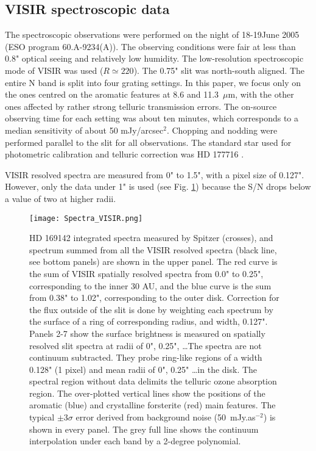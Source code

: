 \documentclass{aa}
\newcommand{\mic}{~$\mu$m\xspace}
\begin{document}
\subsection{VISIR spectroscopic data} \label{sec:spectra}
The spectroscopic observations were performed on the night of 18-19June 2005 (ESO program 60.A-9234(A)). The observing conditions were fair at less than 0.8" optical seeing and relatively low humidity.
The low-resolution spectroscopic mode of VISIR was used ($R\simeq220$). The 0.75" slit was  north-south aligned. The entire N band is split into four grating settings. In this paper, we focus only on the ones centred on the aromatic features at 8.6 and 11.3\mic, with the other ones  affected by rather strong telluric transmission errors. The on-source observing time for each setting was about ten minutes, which corresponds to a median sensitivity of about 50 mJy/arcsec$^2$. 
Chopping and nodding were performed parallel to the slit for all observations. The standard star used for photometric calibration and telluric correction was HD 177716 \citep{Cohen1999}.

VISIR resolved spectra are measured from 0" to 1.5", with a pixel size of 0.127". However, only the data under 1" is used (see Fig. \ref{fig:VISspectra}) because the S/N drops below a value of two at higher radii.
 
\begin{figure}[!ht]
    \raggedleft
    \texttt{[image: Spectra\_VISIR.png]}
    \centering
    \caption{HD 169142 integrated spectra measured by Spitzer (crosses), and spectrum summed from all the VISIR resolved spectra (black line, see bottom panels) are shown in the upper panel. The red curve is the sum of VISIR spatially resolved spectra from 0.0" to 0.25", corresponding to the inner 30 AU, and the blue curve is the sum from 0.38" to 1.02", corresponding to the outer disk. Correction for the flux outside of the slit is done by weighting each spectrum by the surface of a ring of corresponding radius, and width, 0.127". Panels 2-7 show the surface brightness is measured on spatially resolved slit spectra at radii of 0", 0.25", \dots The spectra are not continuum subtracted. They probe ring-like regions of a width 0.128" (1 pixel) and mean radii of 0", 0.25" \dots in the disk. The spectral region without data delimits the telluric ozone absorption region. The over-plotted vertical lines show the positions of the aromatic (blue) and crystalline forsterite (red) main features. The typical $\pm$3$\sigma$ error derived from background noise (50~mJy.as$^{-2}$) is shown in every panel. The grey full line shows the continuum interpolation under each band by a 2-degree polynomial.}
    \label{fig:VISspectra}
\end{figure}
\end{document}
